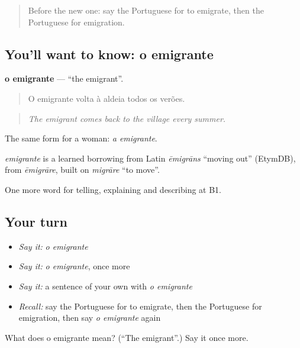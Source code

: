 \label{lesson:PT-C317-emigrante}



\begin{quote}
Before the new one: say the Portuguese for to emigrate, then the Portuguese for emigration.
\end{quote}

\subsection*{You'll want to know: o emigrante}
\textbf{o emigrante} — \textquotedblleft{}the emigrant\textquotedblright{}.

\begin{quote}
O emigrante volta à aldeia todos os verões.
\end{quote}

\begin{quote}
\emph{The emigrant comes back to the village every summer.}
\end{quote}

The same form for a woman: \emph{a emigrante}.

\begin{cousinweb}
\emph{emigrante} is a learned borrowing from Latin \emph{ēmigrāns} \textquotedblleft{}moving out\textquotedblright{} (EtymDB), from \emph{ēmigrāre}, built on \emph{migrāre} \textquotedblleft{}to move\textquotedblright{}.
\end{cousinweb}

\begin{grammarlens}[title={What you've built}]
One more word for telling, explaining and describing at B1.
\end{grammarlens}

\subsection*{Your turn}
\begin{itemize}
\raggedright
  \item \emph{Say it:} \emph{o emigrante}
  \item \emph{Say it:} \emph{o emigrante}, once more
  \item \emph{Say it:} a sentence of your own with \emph{o emigrante}
  \item \emph{Recall:} say the Portuguese for to emigrate, then the Portuguese for emigration, then say \emph{o emigrante} again
\end{itemize}

\begin{tcolorbox}[breakable,colback=teal!4,colframe=teal!35!black,title={Before you move on}]
What does o emigrante mean? (\textquotedblleft{}The emigrant\textquotedblright{}.) Say it once more.
\end{tcolorbox}
